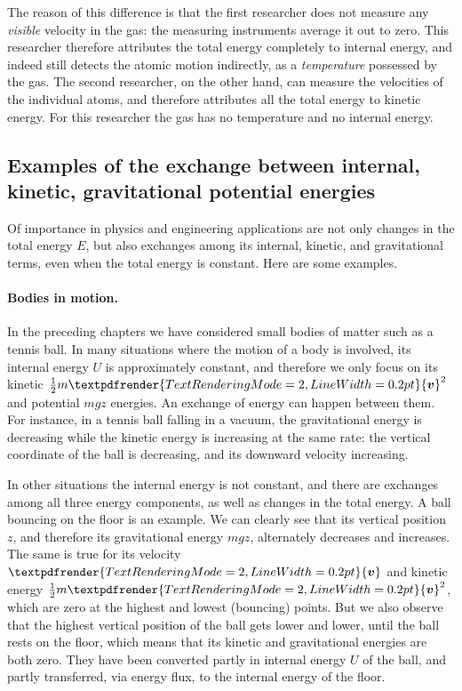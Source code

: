 \documentclass[a4paper,12pt,%
onecolumn,oneside,%
british%
]{memoir}
\renewcommand*{\bm}[1]{\textpdfrender{TextRenderingMode=2,LineWidth=0.2pt}{\boldsymbol{#1}}}
\renewcommand*{\|}[1][]{\nonscript\:#1\vert\nonscript\:\mathopen{}}
\newcommand*{\yv}{\bm{v}}
\newcommand*{\yM}{m}%
\newcommand*{\yE}{E}
\newcommand*{\yU}{U}
\begin{document}
The reason of this difference is that the first researcher does not measure any \emph{visible} velocity in the gas: the measuring instruments average it out to zero. This researcher therefore attributes the total energy completely to internal energy, and indeed still detects the atomic motion indirectly, as a \emph{temperature} possessed by the gas. The second researcher, on the other hand, can measure the velocities of the individual atoms, and therefore attributes all the total energy to kinetic energy. For this researcher the gas has no temperature and no internal energy.


\subsection{Examples of the exchange between internal, kinetic, gravitational potential energies}
\label{sec:energy_constitutive_content}

Of importance in physics and engineering applications are not only changes in the total energy $\yE$, but also exchanges among its internal, kinetic, and gravitational terms, even when the total energy is constant. Here are some examples.

\paragraph{Bodies in motion.}

In the preceding chapters we have considered small bodies of matter such as a tennis ball. In many situations where the motion of a body is involved, its internal energy $\yU$ is approximately constant, and therefore we only focus on its kinetic $\tfrac{1}{2}\yM \yv^{2}$ and potential $\yM g z$ energies. An exchange of energy can happen between them. For instance, in a tennis ball falling in a vacuum, the gravitational energy is decreasing while the kinetic energy is increasing at the same rate: the vertical coordinate of the ball is decreasing, and its downward velocity increasing.

In other situations the internal energy is not constant, and there are exchanges among all three energy components, as well as changes in the total energy. A ball bouncing on the floor is an example. We can clearly see that its vertical position $z$, and therefore its gravitational energy $\yM g z$, alternately decreases and increases. The same is true for its velocity $\yv$ and kinetic energy $\tfrac{1}{2}\yM \yv^{2}$, which are zero at the highest and lowest (bouncing) points. But we also observe that the highest vertical position of the ball gets lower and lower, until the ball rests on the floor, which means that its kinetic and gravitational energies are both zero. They have been converted partly in internal energy $\yU$ of the ball, and partly transferred, via energy flux, to the internal energy of the floor.
\end{document}
